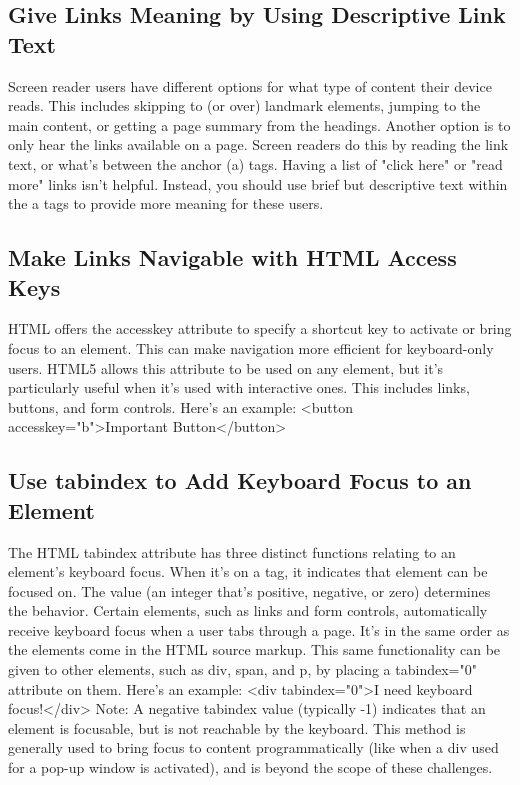 \documentclass{article}%
\begin{document}
%
\subsection{Give Links Meaning by Using Descriptive Link Text}%
\label{subsec:GiveLinksMeaningbyUsingDescriptiveLinkText}%
Screen reader users have different options for what type of content their device reads. This includes skipping to (or over) landmark elements, jumping to the main content, or getting a page summary from the headings. Another option is to only hear the links available on a page.\newline%
Screen readers do this by reading the link text, or what's between the anchor (a) tags. Having a list of "click here" or "read more" links isn't helpful. Instead, you should use brief but descriptive text within the a tags to provide more meaning for these users.\newline%

%
\subsection{Make Links Navigable with HTML Access Keys}%
\label{subsec:MakeLinksNavigablewithHTMLAccessKeys}%
HTML offers the accesskey attribute to specify a shortcut key to activate or bring focus to an element. This can make navigation more efficient for keyboard{-}only users.\newline%
HTML5 allows this attribute to be used on any element, but it's particularly useful when it's used with interactive ones. This includes links, buttons, and form controls.\newline%
Here's an example:\newline%
<button accesskey="b">Important Button</button>\newline%

%
\subsection{Use tabindex to Add Keyboard Focus to an Element}%
\label{subsec:UsetabindextoAddKeyboardFocustoanElement}%
The HTML tabindex attribute has three distinct functions relating to an element's keyboard focus. When it's on a tag, it indicates that element can be focused on. The value (an integer that's positive, negative, or zero) determines the behavior.\newline%
Certain elements, such as links and form controls, automatically receive keyboard focus when a user tabs through a page. It's in the same order as the elements come in the HTML source markup. This same functionality can be given to other elements, such as div, span, and p, by placing a tabindex="0" attribute on them. Here's an example:\newline%
<div tabindex="0">I need keyboard focus!</div>\newline%
Note: A negative tabindex value (typically {-}1) indicates that an element is focusable, but is not reachable by the keyboard. This method is generally used to bring focus to content programmatically (like when a div used for a pop{-}up window is activated), and is beyond the scope of these challenges.\newline%
\end{document}
